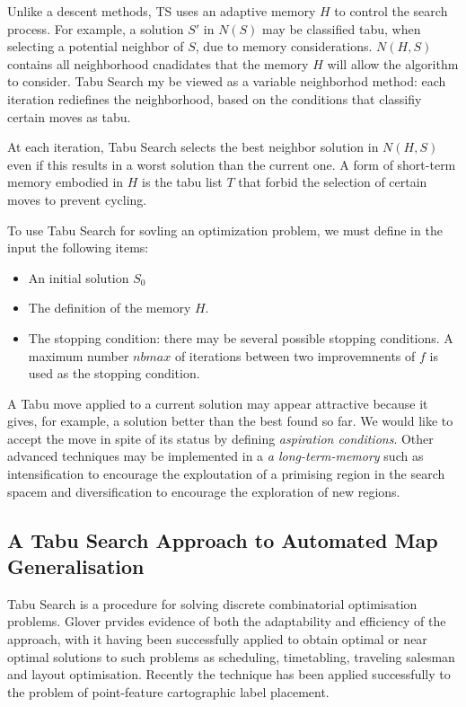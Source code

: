  Unlike a descent methods, TS uses an adaptive memory $H$ to control the search process. For example, a solution $S'$ in $N(S)$ may be classified tabu, when selecting a potential neighbor of $S$, due to memory considerations. $N(H,S)$ contains all neighborhood cnadidates that the memory $H$ will allow the algorithm to consider. Tabu Search my be viewed as a variable neighborhod method: each iteration rediefines the neighborhood, based on the conditions that classifiy certain moves as tabu.

 At each iteration, Tabu Search selects the best neighbor solution in $N(H,S)$ even if this results in a worst solution than the current one. A form of short-term memory embodied in $H$ is the tabu list $T$ that forbid the selection of certain moves to prevent cycling.

 To use Tabu Search for sovling an optimization problem, we must define in the input the following items:
 \begin{itemize}
 \item An initial solution $S_0$
 \item The definition of the memory $H$.
 \item The stopping condition: there may be several possible stopping conditions. A maximum number $nbmax$ of iterations between two improvemnents of $f$ is used as the stopping condition.
 \end{itemize}

A Tabu move applied to a current solution may appear attractive because it gives, for example, a solution better than the best found so far. We would like to accept the move in spite of its status by defining \emph{aspiration conditions}. Other advanced techniques may be implemented in a \emph{a long-term-memory} such as intensification to encourage the exploutation of a primising region in the search spacem and diversification to encourage the exploration of new regions.

\subsection{A Tabu Search Approach to Automated Map Generalisation}
Tabu Search is a procedure for solving discrete combinatorial optimisation problems. Glover prvides evidence of both the adaptability and efficiency of the approach, with it having been successfully applied to obtain optimal or near optimal solutions to such problems as scheduling, timetabling, traveling salesman and layout optimisation. Recently the technique has been applied successfully to the problem of point-feature cartographic label placement. 

